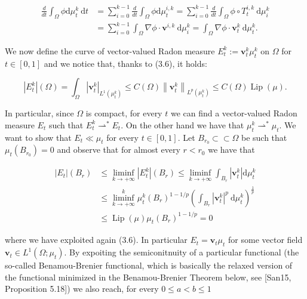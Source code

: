 \documentclass[10pt]{article}
\begin{document}
\[
\begin{aligned}
\frac{d}{d t} \int_{\Omega} \phi \mathrm{d} \mu_{t}^{k} \mathrm{~d} t & =\sum_{i=0}^{k-1} \frac{d}{d t} \int_{\Omega} \phi \mathrm{d} \mu_{t}^{i, k}=\sum_{i=0}^{k-1} \frac{d}{d t} \int_{\Omega} \phi \circ T_{t}^{i, k} \mathrm{~d} \mu_{i}^{k} \\
& =\sum_{i=0}^{k-1} \int_{\Omega} \nabla \phi \cdot \mathbf{v}^{i, k} \mathrm{~d} \mu_{i}^{k}=\int_{\Omega} \nabla \phi \cdot \mathbf{v}_{t}^{k} \mathrm{~d} \mu_{t}^{k} .
\end{aligned}
\]

We now define the curve of vector-valued Radon measure \(E_{t}^{k}:=\mathbf{v}_{t}^{k} \mu_{t}^{k}\) on \(\Omega\) for \(t \in[0,1]\) and we notice that, thanks to (3.6), it holds:

\[
\left|E_{t}^{k}\right|(\Omega)=\int_{\Omega}\left|\mathbf{v}_{t}^{k}\right|_{L^{1}\left(\mu_{t}^{k}\right)} \leq C(\Omega)\left\|\mathbf{v}_{t}^{k}\right\|_{L^{p}\left(\mu_{t}^{k}\right)} \leq C(\Omega) \operatorname{Lip}(\mu) .
\]

In particular, since \(\Omega\) is compact, for every \(t\) we can find a vector-valued Radon measure \(E_{t}\) such that \(E_{t}^{k} \rightharpoonup^{*} E_{t}\). On the other hand we have that \(\mu_{t}^{k} \rightharpoonup^{*} \mu_{t}\). We want to show that \(E_{t} \ll \mu_{t}\) for every \(t \in[0,1]\). Let \(B_{r_{0}} \subset \subset \Omega\) be such that \(\mu_{t}\left(B_{r_{0}}\right)=0\) and observe that for almost every \(r<r_{0}\) we have that

\[
\begin{aligned}
\left|E_{t}\right|\left(B_{r}\right) & \leq \liminf _{k \rightarrow+\infty}\left|E_{t}^{k}\right|\left(B_{r}\right) \leq \liminf _{k \rightarrow+\infty} \int_{B_{r}}\left|\mathbf{v}_{t}^{k}\right| \mathrm{d} \mu_{t}^{k} \\
& \leq \liminf _{k \rightarrow+\infty}^{k} \mu_{t}^{k}\left(B_{r}\right)^{1-1 / p}\left(\int_{B_{r}}\left|\mathbf{v}_{t}^{k}\right|^{p} \mathrm{~d} \mu_{t}^{k}\right)^{\frac{1}{p}} \\
& \leq \operatorname{Lip}(\mu) \mu_{t}\left(B_{r}\right)^{1-1 / p}=0
\end{aligned}
\]

where we have exploited again (3.6). In particular \(E_{t}=\mathbf{v}_{t} \mu_{t}\) for some vector field \(\mathbf{v}_{t} \in L^{1}\left(\Omega ; \mu_{t}\right)\). By expoiting the semiconitnuity of a particular functional (the so-called Benamou-Brenier functional, which is basically the relaxed version of the functional minimized in the Benamou-Brenier Theorem below, see [San15, Proposition 5.18]) we also reach, for every \(0 \leq a<b \leq 1\)
\end{document}
